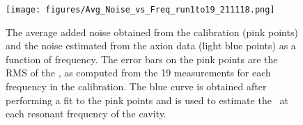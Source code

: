 \begin{figure} [htbp]
  \centering
  \texttt{[image: figures/Avg\_Noise\_vs\_Freq\_run1to19\_211118.png]}
  \caption{The average added noise obtained from the calibration (pink points)
 and the noise estimated from the axion data (light blue points) as a 
function of frequency. The error bars on the pink points are the RMS 
of the \ta, as computed from the 19 measurements for each frequency 
in the calibration. 
The blue curve is obtained after performing a fit to 
the pink points and is used to estimate the \ta\ at each resonant 
frequency of the cavity.}
  \label{fig:hemtcalvsf}
\end{figure}


  

